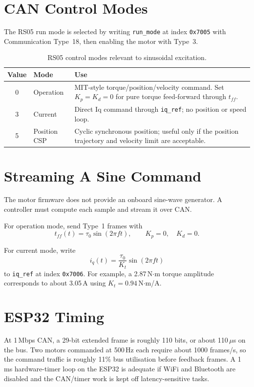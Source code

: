 \documentclass[11pt,letterpaper]{article}
\begin{document}
\section{CAN Control Modes}

The RS05 run mode is selected by writing \texttt{run\_mode} at index
\texttt{0x7005} with Communication Type~18, then enabling the motor with
Type~3.

\begin{table}[h]
\centering
\caption{RS05 control modes relevant to sinusoidal excitation.}
\renewcommand{\arraystretch}{1.25}
\begin{tabular}{c p{3.0cm} p{8.5cm}}
\toprule
\textbf{Value} & \textbf{Mode} & \textbf{Use} \\
\midrule
0 & Operation & MIT-style torque/position/velocity command. Set $K_p=K_d=0$ for pure torque feed-forward through $t_{ff}$. \\
3 & Current & Direct Iq command through \texttt{iq\_ref}; no position or speed loop. \\
5 & Position CSP & Cyclic synchronous position; useful only if the position trajectory and velocity limit are acceptable. \\
\bottomrule
\end{tabular}
\end{table}

\section{Streaming A Sine Command}

The motor firmware does not provide an onboard sine-wave generator. A controller
must compute each sample and stream it over CAN.

For operation mode, send Type~1 frames with
\[
  t_{ff}(t)=\tau_0\sin(2\pi f t), \qquad K_p=0,\quad K_d=0.
\]

For current mode, write
\[
  i_q(t)=\frac{\tau_0}{K_t}\sin(2\pi f t)
\]
to \texttt{iq\_ref} at index \texttt{0x7006}. For example, a
2.87\,N$\cdot$m torque amplitude corresponds to about 3.05\,A using
$K_t=0.94$\,N$\cdot$m/A.

\section{ESP32 Timing}

At 1\,Mbps CAN, a 29-bit extended frame is roughly 110 bits, or about
110\,$\mu$s on the bus. Two motors commanded at 500\,Hz each require about
1000 frames/s, so the command traffic is roughly 11\% bus utilisation before
feedback frames. A 1\,ms hardware-timer loop on the ESP32 is adequate if WiFi
and Bluetooth are disabled and the CAN/timer work is kept off latency-sensitive
tasks.
\end{document}
